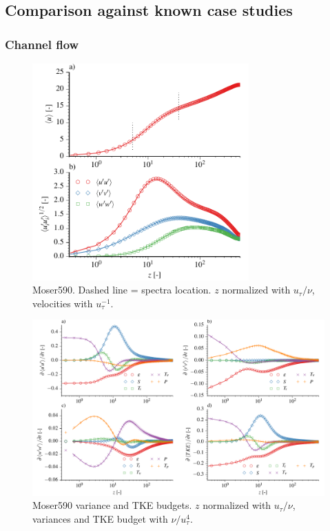 \documentclass[gmd]{copernicus}
\begin{document}
\subsection{Comparison against known case studies}
\subsubsection{Channel flow}

\begin{figure}[t]
\vspace*{2mm}
\begin{center}
\includegraphics[width=8.3cm]{figs/gmd_m590_umean_var.pdf}
\end{center}
\caption{Moser590. Dashed line = spectra location. $z$ normalized with $u_\tau / \nu$, velocities with $u_\tau^{-1}$.}
\end{figure}

\begin{figure}[t]
\vspace*{2mm}
\begin{center}
\includegraphics[width=16.6cm]{figs/gmd_m590_turb_budg.pdf}
\end{center}
\caption{Moser590 variance and TKE budgets. $z$ normalized with $u_\tau / \nu$, variances and TKE budget with $\nu / u_\tau^{4}$.}
\end{figure}
\end{document}
